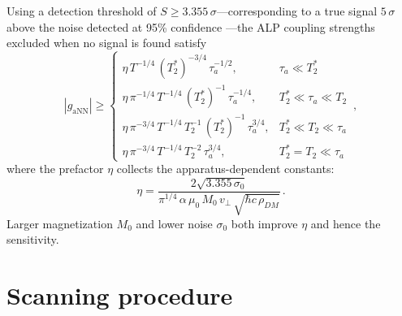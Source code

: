 Using a detection threshold of $S \geq 3.355\,\sigma$---corresponding to a true signal $5\,\sigma$ above the noise detected at 95\% confidence \cite{aybas2021_SolidStateNMR}---the ALP coupling strengths excluded when no signal is found satisfy
\begin{equation}
    |g_{\mathrm{aNN}}| \geqslant
    \left\{
    \begin{array}{cl}
    \eta\, T^{-1/4}\, (T_2^*)^{-3/4}\, \tau_a^{-1/2} ,
    & \tau_a\ll T_2^* \\[6pt]
    \eta\, \pi^{-1/4}\, T^{-1/4}\, (T_2^*)^{-1}\, \tau_a^{-1/4} ,
    &  T_2^*\ll\tau_a \ll T_2\\[6pt]
    \eta\, \pi^{-3/4}\, T^{-1/4}\, T_2^{-1}\, (T_2^*)^{-1}\, \tau_a^{3/4}  ,
    &  T_2^*\ll T_2\ll\tau_a \\[6pt]
    \eta\, \pi^{-3/4}\, T^{-1/4}\, T_2^{-2}\, \tau_a^{3/4}   ,
    &  T_2^*= T_2\ll\tau_a
    \end{array} \right.
    \,, \label{eq:exclusion_threshold}
\end{equation}
where the prefactor $\eta$ collects the apparatus-dependent constants:
\begin{equation}
    \eta = \dfrac{2\sqrt{3.355\,\sigma_0}}{\pi^{1/4}\,\alpha\,\mu_0\,M_0\,v_{\bot}\,\sqrt{\hbar c\,\rho_{DM}}}
    \,.\label{eq:eta}
\end{equation}
Larger magnetization $M_0$ and lower noise $\sigma_0$ both improve $\eta$ and hence the sensitivity.


\section{Scanning procedure}\label{sec:results:procedure}

